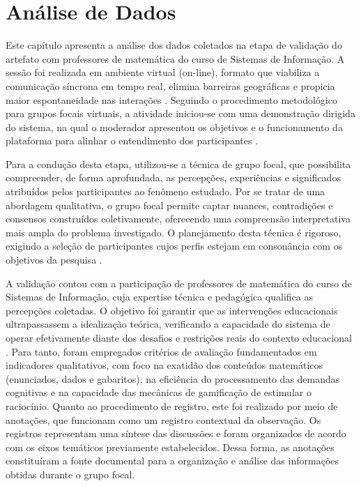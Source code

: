 \chapter{Análise de Dados}
\label{ch:analise-dados}

Este capítulo apresenta a análise dos dados coletados na etapa de validação do artefato com professores de matemática do curso de Sistemas de Informação. A sessão foi realizada em ambiente virtual (on-line), formato que viabiliza a comunicação síncrona em tempo real, elimina barreiras geográficas e propicia maior espontaneidade nas interações \cite{abreu2009}. Seguindo o procedimento metodológico para grupos focais virtuais, a atividade iniciou-se com uma demonstração dirigida do sistema, na qual o moderador apresentou os objetivos e o funcionamento da plataforma para alinhar o entendimento dos participantes \cite{abreu2009}.

Para a condução desta etapa, utilizou-se a técnica de grupo focal, que possibilita compreender, de forma aprofundada, as percepções, experiências e significados atribuídos pelos participantes ao fenômeno estudado. Por se tratar de uma abordagem qualitativa, o grupo focal permite captar nuances, contradições e consensos construídos coletivamente, oferecendo uma compreensão interpretativa mais ampla do problema investigado. O planejamento desta técnica é rigoroso, exigindo a seleção de participantes cujos perfis estejam em consonância com os objetivos da pesquisa \cite{gil2021pesquisa}.

A validação contou com a participação de professores de matemática do curso de Sistemas de Informação, cuja expertise técnica e pedagógica qualifica as percepções coletadas. O objetivo foi garantir que as intervenções educacionais ultrapassassem a idealização teórica, verificando a capacidade do sistema de operar efetivamente diante dos desafios e restrições reais do contexto educacional \cite{plomp2018pesquisa}. Para tanto, foram empregados critérios de avaliação fundamentados em indicadores qualitativos, com foco na exatidão dos conteúdos matemáticos (enunciados, dados e gabaritos), na eficiência do processamento das demandas cognitivas e na capacidade das mecânicas de gamificação de estimular o raciocínio. Quanto ao procedimento de registro, este foi realizado por meio de anotações, que funcionam como um registro contextual da observação. Os registros representam uma síntese das discussões e foram organizados de acordo com os eixos temáticos previamente estabelecidos. Dessa forma, as anotações constituíram a fonte documental para a organização e análise das informações obtidas durante o grupo focal.


